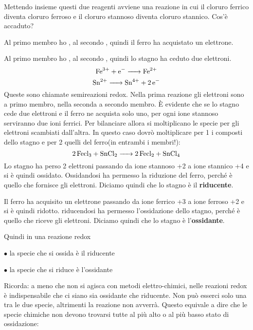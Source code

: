 Mettendo insieme questi due reagenti avviene una reazione in cui il cloruro ferrico diventa cloruro ferroso e il cloruro stannoso diventa cloruro stannico. Cos'è accaduto?

Al primo membro ho , al secondo , quindi il ferro ha acquistato un elettrone.

Al primo membro ho , al secondo , quindi lo stagno ha ceduto due elettroni.
$$\ce{Fe^{3+} + e^- -> Fe^{2+}}$$
$$\ce{Sn^{2+} -> Sn^{4+} + 2 e^-}$$
Queste sono chiamate semireazioni redox.
Nella prima reazione gli elettroni sono a primo membro, nella seconda a secondo membro.
È evidente che se lo stagno cede due elettroni e il ferro ne acquista solo uno, per ogni ione stannoso serviranno due ioni ferrici.
Per bilanciare allora si moltiplicano le specie per gli elettroni scambiati dall'altra.
In questo caso dovrò moltiplicare per 1 i composti dello stagno e per 2 quelli del ferro(in entrambi i membri!):
$$\ce{2 Fecl_3 + SnCl_2 -> 2 Fecl_2 + SnCl_4}$$
Lo stagno ha perso 2 elettroni passando da ione stannoso +2 a ione stannico +4 e si è quindi ossidato. Ossidandosi ha permesso la riduzione del ferro, perché è quello che fornisce gli elettroni. Diciamo quindi che lo stagno è il \textbf{riducente}.

Il ferro ha acquisito un elettrone passando da ione ferrico +3 a ione ferroso +2 e si è quindi ridotto. riducendosi ha permesso l'ossidazione dello stagno, perché è quello che riceve gli elettroni. Diciamo quindi che lo stagno è l'\textbf{ossidante}.

Quindi in una reazione redox

$\bullet$ la specie che si ossida è il riducente

$\bullet$ la specie che si riduce è l'ossidante

Ricorda: a meno che non si agisca con metodi elettro-chimici, nelle reazioni redox è indispensabile che ci siano sia ossidante che riducente. Non può esserci solo una tra le due specie, altrimenti la reazione non avverrà. Questo equivale a dire che le specie chimiche non devono trovarsi tutte al più alto o al più basso stato di ossidazione:

